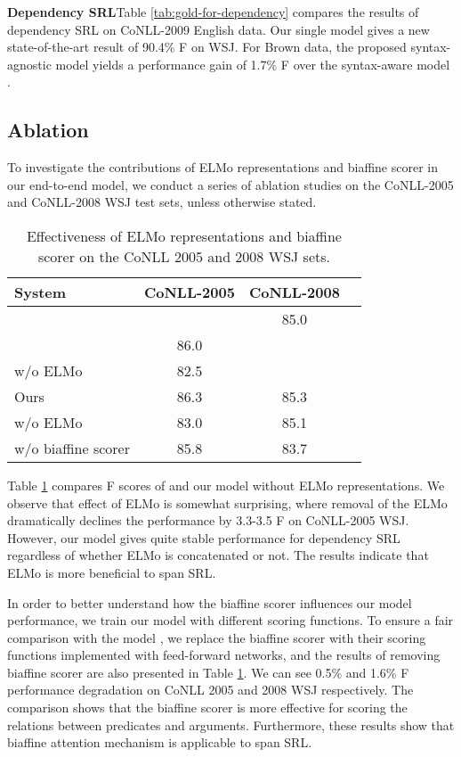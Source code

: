 \documentclass[letterpaper]{article} \usepackage{aaai19}  \usepackage{times}  \usepackage{helvet}  \usepackage{courier}  \usepackage{url}  \usepackage{graphicx}  \frenchspacing  \setlength{\pdfpagewidth}{8.5in}  \setlength{\pdfpageheight}{11in}
\begin{document}
\noindent \textbf{Dependency SRL}\quad Table \ref{tab:gold-for-dependency} compares the results of dependency SRL on CoNLL-2009 English data. Our single model gives a new state-of-the-art result of 90.4\% F on WSJ. For Brown data, the proposed syntax-agnostic model yields a performance gain of 1.7\% F over the syntax-aware model \cite{li2018unified}.

\subsection{Ablation}
To investigate the contributions of ELMo representations and biaffine scorer in our end-to-end model, we conduct a series of ablation studies on the CoNLL-2005 and CoNLL-2008 WSJ test sets, unless otherwise stated.

\begin{table}
	\centering
\begin{tabular}{lccc}
		\toprule
		System & CoNLL-2005& CoNLL-2008\\
		\midrule
		\citeauthor{cai2018full} \shortcite{cai2018full} &  & 85.0  \\
		\midrule
		\citeauthor{he2018jointly} \shortcite{he2018jointly} & 86.0 &  \\
		w/o ELMo & 82.5 &  \\ 
		\midrule
		Ours & 86.3 & 85.3 \\
		w/o ELMo & 83.0 & 85.1 \\
		w/o biaffine scorer & 85.8 & 83.7 \\
		\bottomrule
	\end{tabular}
	\caption{Effectiveness of ELMo representations and biaffine scorer on the CoNLL 2005 and 2008 WSJ sets.}\label{ablation:elmo}
\end{table}

Table \ref{ablation:elmo} compares F scores of \citeauthor{he2018jointly}  and our model without ELMo representations. We observe that effect of ELMo is somewhat surprising, where removal of the ELMo dramatically declines the performance by 3.3-3.5 F on CoNLL-2005 WSJ. However, our model gives quite stable performance for dependency SRL regardless of whether ELMo is concatenated or not. The results indicate that ELMo is more beneficial to span SRL.



In order to better understand how the biaffine scorer influences our model performance, we train our model with different scoring functions. To ensure a fair comparison with the model \cite{he2018jointly}, we replace the biaffine scorer with their scoring functions implemented with feed-forward networks, and the results of removing biaffine scorer are also presented in Table \ref{ablation:elmo}. We can see 0.5\% and 1.6\% F performance degradation on CoNLL 2005 and 2008 WSJ respectively. The comparison shows that the biaffine scorer is more effective for scoring the relations between predicates and arguments. Furthermore, these results show that biaffine attention mechanism is applicable to span SRL. 
\end{document}
